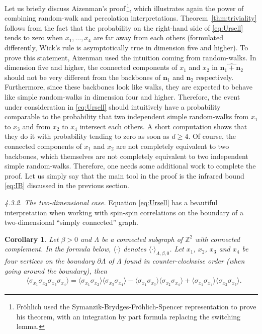 \documentclass[a4paper,oneside,11pt]{article}
\newtheorem{corollary}[theorem]{Corollary}
\begin{document}
Let us briefly discuss Aizenman's proof\,\footnote{Fr\"ohlich used the Symanzik-Brydges-Fr\"ohlich-Spencer representation to prove his theorem, with an integration by part formula replacing the switching lemma.}, which illustrates again the power of combining random-walk and percolation interpretations.
Theorem~\ref{thm:triviality} follows from the fact that the probability on the right-hand side of \eqref{eq:Ursell} tends to zero when $x_1,\dots,x_4$ are far away from each others (formulated differently, Wick's rule is asymptotically true in dimension five and higher). To prove this statement, Aizenman used the intuition coming from random-walks. In dimension five and higher, the connected components of $x_1$ and $x_2$ in $\widehat{{\mathbf n}_1+{\mathbf n} _2}$ should not be very different from the backbones of $\mathbf n_1$ and $\mathbf n_2$ respectively. Furthermore, since these backbones look like walks, they are expected to behave like simple random-walks in dimension four and higher. Therefore, the event under consideration in \eqref{eq:Ursell} should intuitively have a probability comparable to the probability that two independent simple random-walks from $x_1$ to $x_3$ and from $x_2$ to $x_4$ intersect each others. A short computation shows that they do it with probability tending to zero as soon as $d\ge4$. Of course, the connected components of $x_1$ and $x_2$ are not completely equivalent to two backbones, which themselves are not completely equivalent to two independent simple random-walks. Therefore, one needs some additional work to complete the proof. Let us simply say that the main tool in the proof is the infrared bound \eqref{eq:IB} discussed in the previous section. 

\medbreak\noindent
{\em 4.3.2. The two-dimensional case.} Equation \eqref{eq:Ursell} has a beautiful interpretation when working with spin-spin correlations on the boundary of a two-dimensional ``simply connected'' graph. 

\begin{corollary}\label{cor:2d}
Let $\beta>0$ and $\Lambda$ be a connected subgraph of $\mathbb Z^2$ with connected complement. In the formula below, $\langle\cdot\rangle$ denotes $\langle \cdot\rangle_{\Lambda,\beta,0}$. Let $x_1$, $x_2$, $x_3$ and $x_4$ be four vertices on the boundary $\partial\Lambda$ of $\Lambda$ found in counter-clockwise order (when going around the boundary), then 
\begin{align*}&\langle \sigma_{x_1}\sigma_{x_2}\sigma_{x_3}\sigma_{x_4}\rangle=\langle \sigma_{x_1}\sigma_{x_2}\rangle\langle \sigma_{x_3}\sigma_{x_4}\rangle-\langle \sigma_{x_1}\sigma_{x_3}\rangle\langle \sigma_{x_2}\sigma_{x_4}\rangle+\langle \sigma_{x_1}\sigma_{x_4}\rangle\langle \sigma_{x_2}\sigma_{x_3}\rangle.\end{align*}
\end{corollary}
\end{document}
